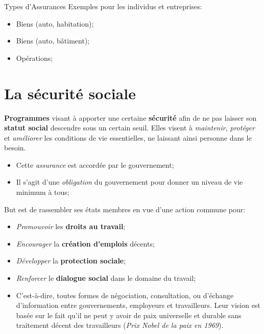 \documentclass[10pt, french]{article}
\begin{document}
\begin{multicols*}{3}
\begin{conceptgen}{Types d'Assurances}
Exemples pour les \textcolor{amethyst}{individus} et \textcolor{amaranth}{entreprises}:
\begin{itemize}[leftmargin = *]
	\item	\textcolor{amethyst}{Biens (auto, habitation)};
	\item	\textcolor{amaranth}{Biens (auto, bâtiment)};
	\item	\textcolor{amaranth}{Opérations};
\end{itemize}
\end{conceptgen}


\section{La sécurité sociale}


\begin{definition}
\textbf{Programmes} visant à apporter une certaine \textbf{sécurité} afin de ne pas laisser son \textbf{statut social} descendre sous un certain seuil. Elles visent à \textit{maintenir}, \textit{protéger} et \textit{améliorer} les conditions de vie essentielles, ne laissant ainsi personne dans le besoin.

\begin{itemize}
	\item	Cette \og \textit{assurance} \fg{} est accordée par le gouvernement;
	\item	Il s'agit d'une \textit{obligation} du gouvernement pour donner un niveau de vie minimum à tous;
\end{itemize}
\end{definition}


\begin{definition}
But est de rassembler ses états membres en vue d'une action commune pour:
\begin{itemize}
	\item	\textit{Promouvoir} les \textbf{droits au travail};
	\item	\textit{Encourager} la \textbf{création d'emplois} décents;
	\item	\textit{Développer} la \textbf{protection sociale};
	\item	\textit{Renforcer} le \textbf{dialogue social} dans le domaine du travail;
	\item[]	C'est-à-dire, toutes formes de négociation, consultation, ou d'échange d'information entre gouvernements, employeurs et travailleurs. Leur vision est basée sur le fait qu'il ne peut y avoir de paix universelle et durable sans traitement décent des travailleurs (\textit{Prix Nobel de la paix en 1969}).
\end{itemize}


\end{definition}
\end{multicols*}
\end{document}
